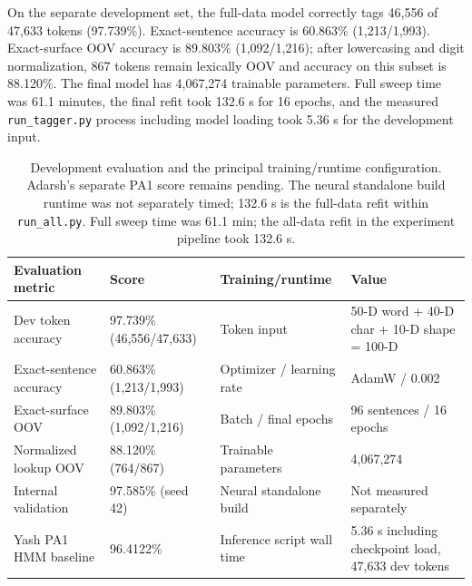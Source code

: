 \documentclass[11pt]{article}
\begin{document}
On the separate development set, the full-data model correctly tags 46,556 of 47,633 tokens (97.739\%). Exact-sentence accuracy is 60.863\% (1,213/1,993). Exact-surface OOV accuracy is 89.803\% (1,092/1,216); after lowercasing and digit normalization, 867 tokens remain lexically OOV and accuracy on this subset is 88.120\%. The final model has 4,067,274 trainable parameters. Full sweep time was 61.1 minutes, the final refit took 132.6 s for 16 epochs, and the measured \texttt{run\_tagger.py} process including model loading took 5.36 s for the development input.

\begin{table}[t]
\centering
\small
\setlength{\tabcolsep}{3pt}
\begin{tabular}{p{2.8cm}p{3.2cm}p{2.7cm}p{6.0cm}}
\toprule
\textbf{Evaluation metric} & \textbf{Score} & \textbf{Training/runtime} & \textbf{Value}\\
\midrule
Dev token accuracy & 97.739\% (46,556/47,633) & Token input & 50-D word + 40-D char + 10-D shape = 100-D\\
Exact-sentence accuracy & 60.863\% (1,213/1,993) & Optimizer / learning rate & AdamW / 0.002\\
Exact-surface OOV & 89.803\% (1,092/1,216) & Batch / final epochs & 96 sentences / 16 epochs\\
Normalized lookup OOV & 88.120\% (764/867) & Trainable parameters & 4,067,274\\
Internal validation & 97.585\% (seed 42) & Neural standalone build & Not measured separately\\
Yash PA1 HMM baseline & 96.4122\% & Inference script wall time & 5.36 s including checkpoint load, 47,633 dev tokens\\
\bottomrule
\end{tabular}
\caption{Development evaluation and the principal training/runtime configuration. Adarsh's separate PA1 score remains pending. The neural standalone build runtime was not separately timed; 132.6 s is the full-data refit within \texttt{run\_all.py}. Full sweep time was 61.1 min; the all-data refit in the experiment pipeline took 132.6 s.}
\label{tab:dev}
\end{table}
\end{document}
